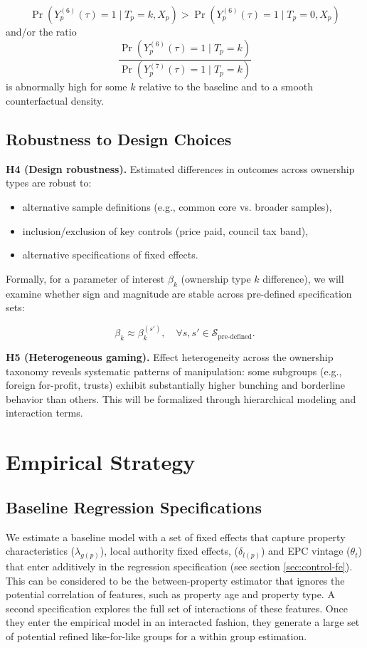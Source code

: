 \documentclass[12pt]{article}
\begin{document}
\[
\Pr\left( Y^{(6)}_p(\tau) = 1 \mid T_p = k, X_p \right) >
\Pr\left( Y^{(6)}_p(\tau) = 1 \mid T_p = 0, X_p \right)
\]
and/or the ratio
\[
\frac{\Pr\left( Y^{(6)}_p(\tau) = 1 \mid T_p = k \right)}
{\Pr\left( Y^{(7)}_p(\tau) = 1 \mid T_p = k \right)}
\]
is abnormally high for some $k$ relative to the baseline and to a smooth counterfactual density.

\subsection{Robustness to Design Choices}

\textbf{H4 (Design robustness).} 
Estimated differences in outcomes across ownership types are robust to:

\begin{itemize}
    \item alternative sample definitions (e.g., common core vs. broader samples),
    \item inclusion/exclusion of key controls (price paid, council tax band),
    \item alternative specifications of fixed effects.
\end{itemize}

Formally, for a parameter of interest $\beta_{k}$ (ownership type $k$ difference), we will examine whether sign and magnitude are stable across pre-defined specification sets:

\[
\beta_{k} \approx \beta_{k}^{(s')}, \quad \forall s,s' \in \mathcal{S}_{\text{pre-defined}}.
\]


\textbf{H5 (Heterogeneous gaming).}
Effect heterogeneity across the ownership taxonomy reveals systematic patterns of manipulation: some subgroups (e.g., foreign for-profit, trusts) exhibit substantially higher bunching and borderline behavior than others. This will be formalized through hierarchical modeling and interaction terms.

\section{Empirical Strategy}

\subsection{Baseline Regression Specifications}

We estimate a baseline model with a set of fixed effects that capture property characteristics ($\lambda_{g(p)}$), local authority fixed effects, ($\delta_{l(p)}$) and EPC vintage ($\theta_t$) that enter additively in the regression specification (see section \ref{sec:control-fe}). This can be considered to be the between-property estimator that ignores the potential correlation of features, such as property age and property type. A second specification explores the full set of interactions of these features. Once they enter the empirical model in an interacted fashion, they generate a large set of potential refined like-for-like groups for a within group estimation. 
\end{document}
